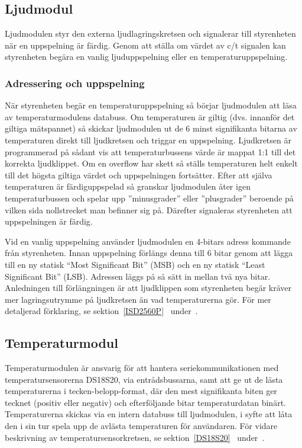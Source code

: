 \documentclass[a4paper,11pt]{article}
\begin{document}
	\subsection{Ljudmodul}
		Ljudmodulen styr den externa ljudlagringskretsen och signalerar till styrenheten när en uppspelning är färdig. Genom att ställa om värdet av c/t signalen kan styrenheten begära en vanlig ljuduppspelning eller en temperaturuppspelning.

		\subsubsection{Adressering och uppspelning}
När styrenheten begär en temperaturuppspelning så börjar ljudmodulen att läsa av temperaturmodulens databuss. Om temperaturen är giltig (dvs. innanför det giltiga mätspannet) så skickar ljudmodulen ut de 6 minst signifikanta bitarna av temperaturen direkt till ljudkretsen och triggar en uppspelning. Ljudkretsen är programmerad på sådant vis att temperaturbussens värde är mappat 1:1 till det korrekta ljudklippet.  Om en overflow har skett så ställs temperaturen helt enkelt till det högsta giltiga värdet och uppspelningen fortsätter. Efter att själva temperaturen är färdiguppspelad så granskar ljudmodulen åter igen temperaturbussen och spelar upp ''minusgrader'' eller ''plusgrader'' beroende på vilken sida nollstrecket man befinner sig på. Därefter signaleras styrenheten att uppspelningen är färdig.

Vid en vanlig uppspelning använder ljudmodulen en 4-bitars adress kommande från styrenheten. Innan uppspelning förlängs denna till 6 bitar genom att lägga till en ny statisk ``Most Significant Bit'' (MSB) och en ny statisk ``Least Significant Bit'' (LSB). Adressen läggs på så sätt in mellan två nya bitar. Anledningen till förlängningen är att ljudklippen som styrenheten begär kräver mer lagringsutrymme på ljudkretsen än vad temperaturerna gör. För mer detaljerad förklaring, se sektion~\ref{ISD2560P}~ under~.

	\subsection{Temperaturmodul}

	Temperaturmodulen är ansvarig för att hantera seriekommunikationen med 
	temperatursensorerna DS18S20, via entrådsbussarna, samt att ge ut de lästa temperaturerna
	i tecken-belopp-format, där den mest signifikanta biten ger tecknet (positiv eller negativ) och efterföljande bitar temperaturdatan binärt.
	Temperaturerna skickas via en intern databuss till ljudmodulen, i syfte att låta den i sin tur spela upp de avlästa temperaturen för användaren. 
	För vidare beskrivning av temperatursensorkretsen, se sektion~\ref{DS18S20}~ under~.
\end{document}
